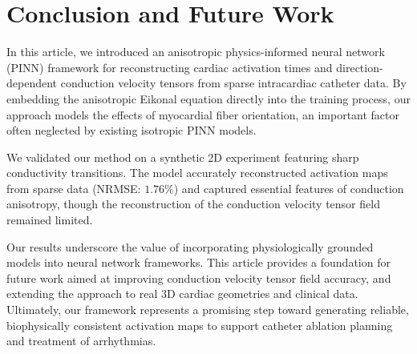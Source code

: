 \section{Conclusion and Future Work}

In this article, we introduced an anisotropic physics-informed neural network (PINN) framework for reconstructing cardiac activation times and direction-dependent conduction velocity tensors from sparse intracardiac catheter data. By embedding the anisotropic Eikonal equation directly into the training process, our approach models the effects of myocardial fiber orientation, an important factor often neglected by existing isotropic PINN models.

We validated our method on a synthetic 2D experiment featuring sharp conductivity transitions. The model accurately reconstructed activation maps from sparse data (NRMSE: $1.76\%$) and captured essential features of conduction anisotropy, though the reconstruction of the conduction velocity tensor field remained limited.

Our results underscore the value of incorporating physiologically grounded models into neural network frameworks. This article provides a foundation for future work aimed at improving conduction velocity tensor field accuracy, and extending the approach to real 3D cardiac geometries and clinical data. Ultimately, our framework represents a promising step toward generating reliable, biophysically consistent activation maps to support catheter ablation planning and treatment of arrhythmias.